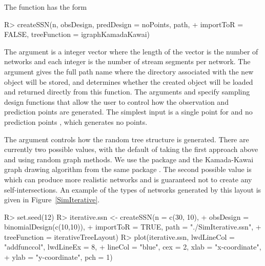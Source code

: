 \documentclass[nojss]{jss}
\renewenvironment{Schunk}{\vspace{\topsep}}{\vspace{\topsep}}
\begin{document}
The  function has the form
\begin{Schunk}
\begin{Sinput}
R> createSSN(n, obsDesign, predDesign = noPoints, path,
+     importToR = FALSE, treeFunction = igraphKamadaKawai)
\end{Sinput}
\end{Schunk}

The argument  is a integer vector where the length of the
vector is the number of networks and each integer is the number of
stream segments per network. The  argument gives the full
path name where the  directory associated with the new
 object will be stored, and
 determines whether the created object will be loaded
and returned directly from this function. The arguments
 and  specify sampling design
functions that allow the user to control how the observation and
prediction points are generated. The simplest input is a single point
for  and no prediction points , which generates no points.

The argument  controls how the random tree
structure is generated. There are currently two possible values, with
the default of  taking the first approach
above and using random graph methods. We use the  package
and the Kamada-Kawai graph drawing algorithm from the same package
\citep{Csar:Nepu:2006}. The second possible value is
 which can produce more realistic networks
and is guaranteed not to create any self-intersections.  An example of
the types of networks generated by this layout is given in
Figure~\ref{SimIterative}.

\begin{Schunk}
\begin{Sinput}
R> set.seed(12)
R> iterative.ssn <- createSSN(n = c(30, 10),
+     obsDesign = binomialDesign(c(10,10)),
+     importToR = TRUE, path = "./SimIterative.ssn",
+     treeFunction = iterativeTreeLayout)
R> plot(iterative.ssn, lwdLineCol = "addfunccol", lwdLineEx = 8,
+     lineCol = "blue", cex = 2, xlab = "x-coordinate",
+     ylab = "y-coordinate", pch = 1)
\end{Sinput}
\end{Schunk}
\end{document}
